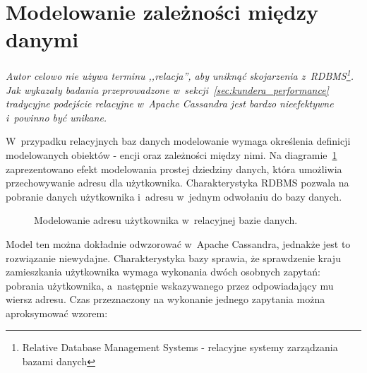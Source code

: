 \section{Modelowanie zależności między danymi}
\label{sec:relation_modeling}

\emph{Autor celowo nie używa terminu ,,relacja'', aby uniknąć skojarzenia z~RDBMS\footnote{Relative Database Management Systems - relacyjne systemy zarządzania bazami danych}. Jak wykazały badania przeprowadzone w~sekcji~\ref{sec:kundera_performance} tradycyjne podejście relacyjne w~Apache Cassandra jest bardzo nieefektywne i~powinno być unikane.}

W~przypadku relacyjnych baz danych modelowanie wymaga określenia definicji modelowanych obiektów - encji oraz zależności między nimi. Na diagramie~\ref{fig:er_user_address} zaprezentowano efekt modelowania prostej dziedziny danych, która umożliwia przechowywanie adresu dla użytkownika. Charakterystyka RDBMS pozwala na pobranie danych użytkownika i~adresu w~jednym odwołaniu do bazy danych.

\begin{figure}[ht!]
	\centering

	\caption{Modelowanie adresu użytkownika w~relacyjnej bazie danych.}
	\label{fig:er_user_address}
\end{figure}

Model ten można dokładnie odwzorować w~Apache Cassandra, jednakże jest to rozwiązanie niewydajne. Charakterystyka bazy sprawia, że sprawdzenie kraju zamieszkania użytkownika wymaga wykonania dwóch osobnych zapytań: pobrania użytkownika, a~następnie wskazywanego przez odpowiadający mu wiersz adresu. Czas przeznaczony na wykonanie jednego zapytania można aproksymować wzorem:

